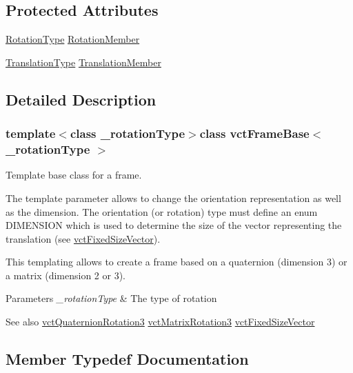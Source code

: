 \subsection*{Protected Attributes}
\begin{DoxyCompactItemize}
\item 
\hyperlink{classvct_frame_base_a02e4eaad478400dd1d81e772caf3b01b}{Rotation\+Type} \hyperlink{classvct_frame_base_a686087937bca6d58cbfaf251736915b4}{Rotation\+Member}
\item 
\hyperlink{classvct_frame_base_a4c397a93b65f0c38e75e99ff3a659c23}{Translation\+Type} \hyperlink{classvct_frame_base_a982d51cac7f38f898989db9f8ad3ff84}{Translation\+Member}
\end{DoxyCompactItemize}


\subsection{Detailed Description}
\subsubsection*{template$<$class \+\_\+rotation\+Type$>$class vct\+Frame\+Base$<$ \+\_\+rotation\+Type $>$}

Template base class for a frame. 

The template parameter allows to change the orientation representation as well as the dimension. The orientation (or rotation) type must define an enum D\+I\+M\+E\+N\+S\+I\+O\+N which is used to determine the size of the vector representing the translation (see \hyperlink{classvct_fixed_size_vector}{vct\+Fixed\+Size\+Vector}).

This templating allows to create a frame based on a quaternion (dimension 3) or a matrix (dimension 2 or 3).


\begin{DoxyParams}{Parameters}
{\em \+\_\+rotation\+Type} & The type of rotation\\
\hline
\end{DoxyParams}
\begin{DoxySeeAlso}{See also}
\hyperlink{classvct_quaternion_rotation3}{vct\+Quaternion\+Rotation3} \hyperlink{classvct_matrix_rotation3}{vct\+Matrix\+Rotation3} \hyperlink{classvct_fixed_size_vector}{vct\+Fixed\+Size\+Vector} 
\end{DoxySeeAlso}


\subsection{Member Typedef Documentation}
\hypertarget{classvct_frame_base_a02e4eaad478400dd1d81e772caf3b01b}{}
